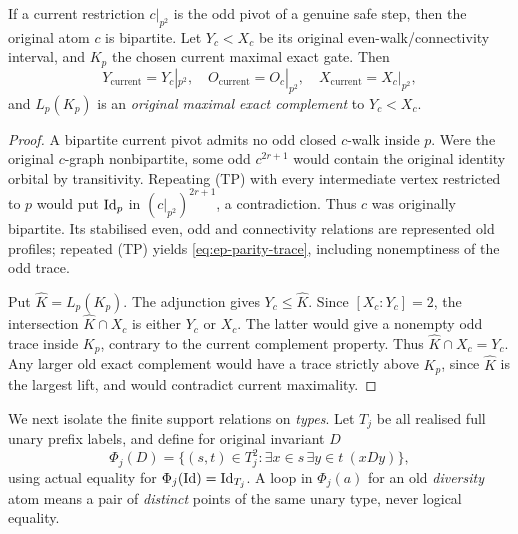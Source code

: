 \begin{lemma}
\label{lem:ep-old-gate}
If a current restriction \(c|_{p^2}\) is the odd pivot of a
genuine safe step, then the original atom \(c\) is bipartite.
Let \(Y_c<X_c\) be its original even-walk/connectivity interval,
and \(K_p\) the chosen current maximal exact gate. Then
\[
  Y_{\mathrm{current}}=Y_c|_{p^2},\quad
  O_{\mathrm{current}}=O_c|_{p^2},\quad
  X_{\mathrm{current}}=X_c|_{p^2},
 \tag{E4}\label{eq:ep-parity-trace}
\]
and \(L_p(K_p)\) is an \emph{original maximal exact complement}
to \(Y_c<X_c\).
\end{lemma}
\begin{proof}
A bipartite current pivot admits no odd closed \(c\)-walk
inside \(p\). Were the original \(c\)-graph nonbipartite,
some odd \(c^{2r+1}\) would contain the original identity
orbital by transitivity. Repeating (TP) with every
intermediate vertex restricted to \(p\) would put
\(\mathrm{Id}_p\) in \((c|_{p^2})^{2r+1}\), a contradiction.
Thus \(c\) was originally bipartite. Its stabilised even,
odd and connectivity relations are represented old profiles;
repeated (TP) yields \eqref{eq:ep-parity-trace},
including nonemptiness of the odd trace.

Put \(\widehat K=L_p(K_p)\). The adjunction gives
\(Y_c\le\widehat K\). Since \([X_c:Y_c]=2\),
the intersection \(\widehat K\cap X_c\) is either \(Y_c\)
or \(X_c\). The latter would give a nonempty odd trace
inside \(K_p\), contrary to the current complement property.
Thus \(\widehat K\cap X_c=Y_c\).
Any larger old exact complement would have a trace
strictly above \(K_p\), since \(\widehat K\) is the largest
lift, and would contradict current maximality.
\end{proof}

We next isolate the finite support relations on \emph{types}.
Let \(T_j\) be all realised full unary prefix labels, and define
for original invariant \(D\)
\[
   \Phi_j(D)=
   \{(s,t)\in T_j^2:
         \exists x\in s\,\exists y\in t\ (xDy)\},
   \tag{E5}\label{eq:ep-Phi}
\]
using actual equality for \(\Phi_j(\mathrm{Id})=\mathrm{Id}_{T_j}\).
A loop in \(\Phi_j(a)\) for an old \emph{diversity} atom
means a pair of \emph{distinct} points of the same unary type,
never logical equality.


